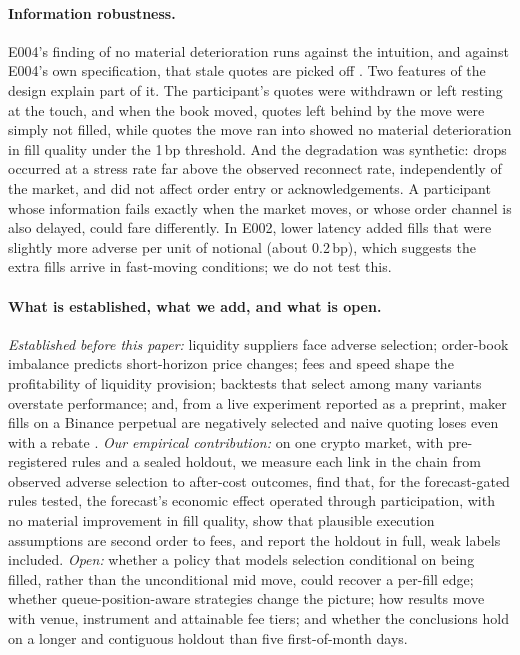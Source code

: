 \documentclass[11pt]{article}
\newcommand{\bp}{\,bp}
\begin{document}
\paragraph{Information robustness.} E004's finding of no material deterioration runs against the intuition, and against E004's own specification,
that stale quotes are picked off \citep{foucault2003,foucault2017,budish2015}. Two features of the design explain part of
it. The participant's quotes were withdrawn or left resting at the touch, and when the book moved, quotes left behind by
the move were simply not filled, while quotes the move ran into showed no material deterioration in fill quality under
the 1\bp{} threshold. And the
degradation was synthetic: drops occurred at a stress rate far above the observed reconnect rate, independently of the
market, and did not affect order entry or acknowledgements. A participant whose information fails exactly when the
market moves, or whose order channel is also delayed, could fare differently. In E002, lower latency added fills that
were slightly more adverse per unit of notional (about 0.2\bp), which suggests the extra fills arrive in fast-moving
conditions; we do not test this.

\paragraph{What is established, what we add, and what is open.} \emph{Established before this paper:} liquidity suppliers
face adverse selection; order-book imbalance predicts short-horizon price changes; fees and speed shape the profitability
of liquidity provision; backtests that select among many variants overstate performance; and, from a live experiment
reported as a preprint, maker fills on a Binance perpetual are negatively selected and naive quoting loses even with a
rebate \citep{albers2025dilemma}. \emph{Our empirical
contribution:} on one crypto market, with pre-registered rules and a sealed holdout, we measure each link in the chain
from observed adverse selection to after-cost outcomes, find that, for the forecast-gated rules tested, the forecast's
economic effect operated through participation, with no material improvement in fill quality, show that plausible execution assumptions are second order to fees, and report
the holdout in full, weak labels included. \emph{Open:} whether a policy that models selection conditional on being
filled, rather than the unconditional mid move, could recover a per-fill edge; whether queue-position-aware strategies
change the picture; how results move with venue, instrument and attainable fee tiers; and whether the conclusions hold
on a longer and contiguous holdout than five first-of-month days.
\end{document}
